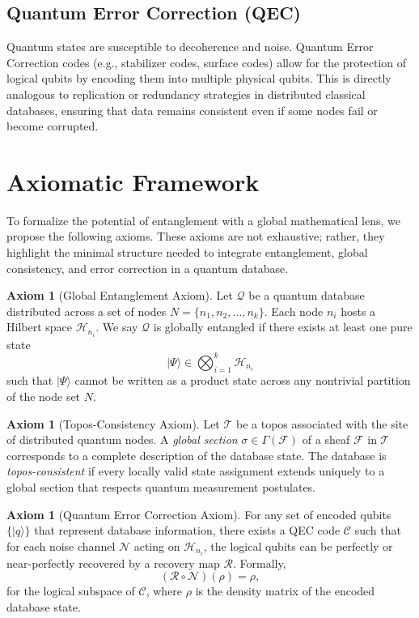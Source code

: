\documentclass[12pt]{article}
\theoremstyle{definition}
\newtheorem{axiom}[theorem]{Axiom}
\theoremstyle{remark}
\begin{document}
\subsection{Quantum Error Correction (QEC)}
Quantum states are susceptible to decoherence and noise. Quantum Error Correction codes (e.g., stabilizer codes, surface codes) allow for the protection of logical qubits by encoding them into multiple physical qubits. This is directly analogous to replication or redundancy strategies in distributed classical databases, ensuring that data remains consistent even if some nodes fail or become corrupted.

\section{Axiomatic Framework}
\label{sec:axioms}
To formalize the potential of entanglement with a global mathematical lens, we propose the following axioms. These axioms are not exhaustive; rather, they highlight the minimal structure needed to integrate entanglement, global consistency, and error correction in a quantum database.

\begin{axiom}[Global Entanglement Axiom]
\label{ax:global_entanglement}
Let $\mathcal{Q}$ be a quantum database distributed across a set of nodes $N = \{n_1, n_2, \ldots, n_k\}$. Each node $n_i$ hosts a Hilbert space $\mathcal{H}_{n_i}$. We say $\mathcal{Q}$ is globally entangled if there exists at least one pure state 
\[
|\Psi\rangle \in \bigotimes_{i=1}^k \mathcal{H}_{n_i}
\]
such that $|\Psi\rangle$ cannot be written as a product state across any nontrivial partition of the node set $N$.
\end{axiom}

\begin{axiom}[Topos-Consistency Axiom]
\label{ax:topos_consistency}
Let $\mathcal{T}$ be a topos associated with the site of distributed quantum nodes. A \textit{global section} $\sigma \in \Gamma(\mathcal{F})$ of a sheaf $\mathcal{F}$ in $\mathcal{T}$ corresponds to a complete description of the database state. The database is \textit{topos-consistent} if every locally valid state assignment extends uniquely to a global section that respects quantum measurement postulates. 
\end{axiom}

\begin{axiom}[Quantum Error Correction Axiom]
\label{ax:qec_axiom}
For any set of encoded qubits $\{ |q\rangle \}$ that represent database information, there exists a QEC code $\mathcal{C}$ such that for each noise channel $\mathcal{N}$ acting on $\mathcal{H}_{n_i}$, the logical qubits can be perfectly or near-perfectly recovered by a recovery map $\mathcal{R}$. Formally,
\[
(\mathcal{R} \circ \mathcal{N})(\rho) = \rho, 
\]
for the logical subspace of $\mathcal{C}$, where $\rho$ is the density matrix of the encoded database state.
\end{axiom}
\end{document}
